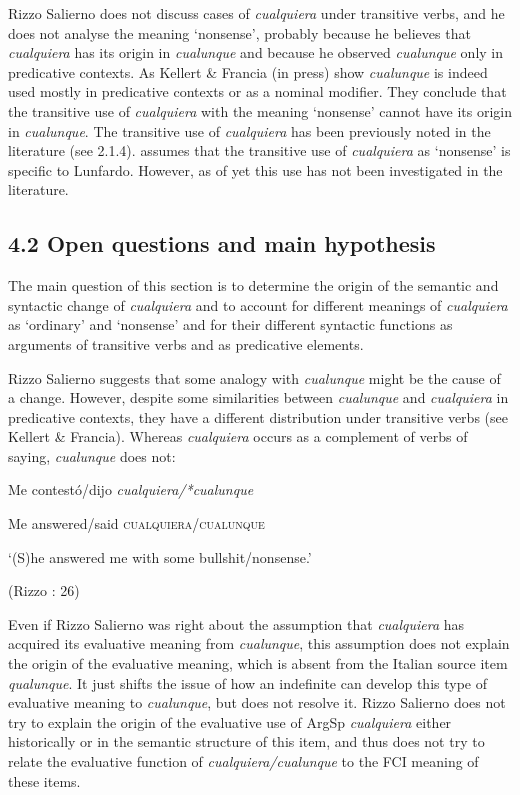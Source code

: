\documentclass[output=paper]{langscibook}
\begin{document}
Rizzo Salierno does not discuss cases of \textit{cualquiera} under transitive verbs, and he does not analyse the meaning ‘nonsense’, probably because he believes that \textit{cualquiera} has its origin in \textit{cualunque} and because he observed \textit{cualunque} only in predicative contexts. As Kellert \& Francia (in press) show \textit{cualunque} is indeed used mostly in predicative contexts or as a nominal modifier. They conclude that the transitive use of \textit{cualquiera} with the meaning ‘nonsense’ cannot have its origin in \textit{cualunque}. The transitive use of \textit{cualquiera} has been previously noted in the literature (see 2.1.4). \citet{Conde2011} assumes that the transitive use of \textit{cualquiera} as ‘nonsense’ is specific to Lunfardo. However, as of yet this use has not been investigated in the literature.

\subsection{\textbf{4.2} \textbf{Open} \textbf{questions} \textbf{and} \textbf{main} \textbf{hypothesis}}

The main question of this section is to determine the origin of the semantic and syntactic change of \textit{cualquiera} and to account for different meanings of \textit{cualquiera} as ‘ordinary’ and ‘nonsense’ and for their different syntactic functions as arguments of transitive verbs and as predicative elements.

  Rizzo Salierno suggests that some analogy with \textit{cualunque} might be the cause of a change. However, despite some similarities between \textit{cualunque} and \textit{cualquiera} in predicative contexts, they have a different distribution under transitive verbs (see Kellert \& Francia). Whereas \textit{cualquiera} occurs as a complement of verbs of saying, \textit{cualunque} does not:

    Me  contestó/dijo  \textit{cualquiera/*cualunque}

    Me  answered/said  \textsc{cualquiera/cualunque}

    ‘(S)he answered me with some bullshit/nonsense.’

    (Rizzo \citealt{Salierno2013}: 26)

Even if Rizzo Salierno was right about the assumption that \textit{cualquiera} has acquired its evaluative meaning from \textit{cualunque}, this assumption does not explain the origin of the evaluative meaning, which is absent from the Italian source item \textit{qualunque}. It just shifts the issue of how an indefinite can develop this type of evaluative meaning to \textit{cualunque}, but does not resolve it. Rizzo Salierno does not try to explain the origin of the evaluative use of ArgSp \textit{cualquiera} either historically or in the semantic structure of this item, and thus does not try to relate the evaluative function of \textit{cualquiera/cualunque} to the FCI meaning of these items. 
\end{document}
